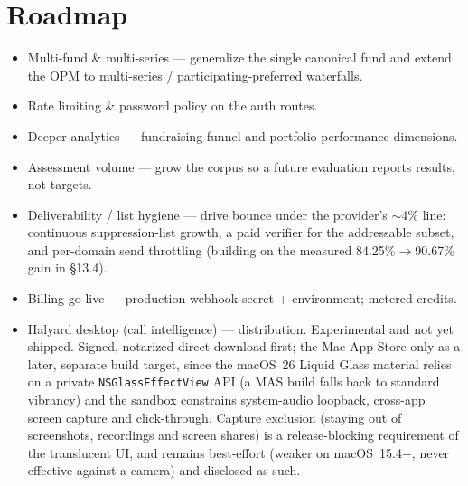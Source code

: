 \documentclass[11pt]{article}
\begin{document}
\section{Roadmap}
\begin{itemize}[leftmargin=1.2em]
\item Multi-fund \& multi-series --- generalize the single canonical fund and
extend the OPM to multi-series / participating-preferred waterfalls.
\item Rate limiting \& password policy on the auth routes.
\item Deeper analytics --- fundraising-funnel and portfolio-performance dimensions.
\item Assessment volume --- grow the corpus so a future evaluation reports results,
not targets.
\item Deliverability / list hygiene --- drive bounce under the provider's
$\sim$4\% line: continuous suppression-list growth, a paid verifier for the
addressable subset, and per-domain send throttling (building on the measured
84.25\%$\to$90.67\% gain in \S13.4).
\item Billing go-live --- production webhook secret + environment; metered credits.
\item Halyard desktop (call intelligence) --- distribution. Experimental and not yet
shipped. Signed, notarized direct download first; the Mac App Store only as a later,
separate build target, since the macOS~26 Liquid Glass material relies on a private
\texttt{NSGlassEffectView} API (a MAS build falls back to standard vibrancy) and the
sandbox constrains system-audio loopback, cross-app screen capture and click-through.
Capture exclusion (staying out of screenshots, recordings and screen shares) is a
release-blocking requirement of the translucent UI, and remains best-effort
(weaker on macOS~15.4+, never effective against a camera) and disclosed as such.
\end{itemize}

\end{document}

